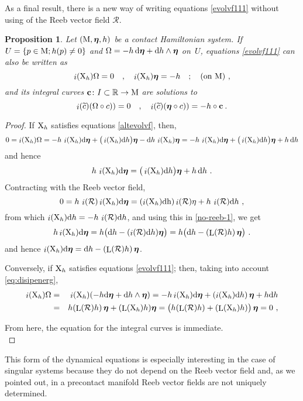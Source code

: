 \documentclass[12pt]{report}
\newtheorem{prop}[teor]{Proposition}
\def\beq{\begin{equation}}
\def\eeq{\end{equation}}
\def\beann{\begin{eqnarray*}}
\def\eeann{\end{eqnarray*}}
\def\qed{\ifvmode\removelastskip\fi
{\unskip\nobreak\hfil\penalty50\hbox{}\nobreak\hfil
\hbox{\vrule height1.2ex width1.2ex}\parfillskip=0pt
\finalhyphendemerits=0 \par\smallskip}}
\def\d{{\rm d}}
\def\h{{\rm h}}
\def\Real{\mathbb{R}}
\def\bmeta{\mbox{\boldmath $\eta$}}
\def\X{{\rm X}}
\def\Lie{\mathop{\rm L}\nolimits}
\def\inn{\mathop{i}\nolimits}
\newcommand{\Reeb}{\mathcal{R}}
\begin{document}
As a final result, there is a new way of writing equations \eqref{evolvf111} 
without using of the Reeb vector field $\Reeb$. 

\begin{prop}
Let $({\rm M},\bmeta,h)$ be a contact Hamiltonian system.
If $U=\{p\in {\rm M};h(p)\not= 0\}$ and $\Omega = -h\,\d\bmeta+\d h\wedge\bmeta$ on~$U$,
equations \eqref{evolvf111} can also be written as
\beq
\label{altevolvf}
\inn(\X_h)\Omega=0 \quad,\quad \inn(\X_h)\bmeta=-h\quad ;
\quad \mbox{\rm (on ${\rm M}$)} \ , 
\eeq
and its integral curves ${\bf c}\colon I\subset\Real\to {\rm M}$ are solutions to
$$
\inn(\widetilde c)(\Omega\circ c)) = 0 \quad , \quad\inn(\widetilde c)(\bmeta\circ c)) = - h\circ{\bf c} \:. 
$$
\end{prop}
\begin{proof}
If $\X_h$ satisfies equations \eqref{altevolvf}, then,
$$
0=\inn(\X_h)\Omega=-h\,\inn(\X_h)\d\bmeta+\big(\inn(\X_h)\d h\big)\bmeta-\d h\,\inn(\X_h)\bmeta=-h\,\inn(\X_h)\d\bmeta+\big(\inn(\X_h)\d h\big)\bmeta+h\,\d h
$$
and hence
\beq
\label{no-reeb-1}
h\,\inn(\X_h)\d\bmeta=\big(\inn(\X_h)\d h\big)\bmeta+h\,\d h \ .
\eeq
Contracting with the Reeb vector field,
\begin{equation*}
0=h\,\inn(\Reeb)\inn(\X_h)\d\bmeta =
(\inn(\X_h)\d\h)\inn(\Reeb)\eta+h\,\inn(\Reeb)\d h\ ,
\end{equation*}
from which $\inn(\X_h)\d h=-h\,\inn(\Reeb)\d h$,
and using this in \eqref{no-reeb-1}, we get
\begin{equation*}
h\inn(\X_h)\d\bmeta=
h\big(\d h-(\inn(\Reeb)\d h)\bmeta\big)=
h\big(\d h-(\Lie(\Reeb)h)\,\bmeta\big)\ .
\end{equation*}
and hence $\inn(\X_h)\d\bmeta=\d h-(\Lie(\Reeb)h)\,\bmeta$.
    
Conversely, if $\X_h$ satisfies equations  \eqref{evolvf111}; then, taking into account \eqref{eq:disipenerg},
\beann
\inn(\X_h)\Omega&=&\inn(\X_h)(-h\d\bmeta+\d h\wedge\bmeta)=
-h\inn(\X_h)\d\bmeta+(\inn(\X_h)\d h)\,\bmeta+h\d h
\\ &=& 
h(\Lie(\Reeb)h)\,\bmeta+(\Lie(\X_h)h)\bmeta=
\big(h(\Lie(\Reeb)h)+(\Lie(\X_h)h)\big)\,\bmeta=0 \ ,
\eeann 

From here, the equation for the integral curves is immediate.
\\ \qed\end{proof}

This form of the dynamical equations is especially interesting in the case of singular systems because they do not depend on the Reeb vector field and, as we pointed out, 
in a precontact manifold Reeb vector fields are not uniquely determined.
\end{document}
